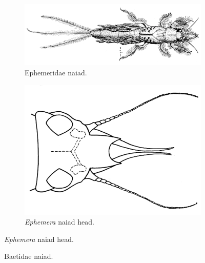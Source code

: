 \documentclass[letterpaper, 11pt]{article}
\begin{document}
\begin{figure}[ht!]
    \centering
    \begin{subfigure}[ht!]{0.65\textwidth}
        \includegraphics[width=\textwidth]{ephemNaiad.png}
        \caption{Ephemeridae naiad. \citep[Modified from Fig. 59 in][]{bhlpart97188ephem}}
        \label{fig:ephemeridlarva}
    \end{subfigure}
    \hfill
    \begin{subfigure}[ht!]{0.24\textwidth}
        \includegraphics[width=\textwidth]{ephemNaiadHead.png}
        \caption{\textit{Ephemera} naiad head. \citep[Modified from Fig. 50 in][]{bhlpart97188ephem}}
        \label{fig:ephemeridlarvahead}
    \end{subfigure}
    \label{fig:ephemeridLarvae}
\end{figure}

\begin{figure}[ht!]
  \centering
  \caption{Baetidae naiad. \citep[Modified from Fig. 240 in][]{bhlpart97188ephem}}
  \label{fig:baetidNaiad}
\end{figure}
\end{document}
